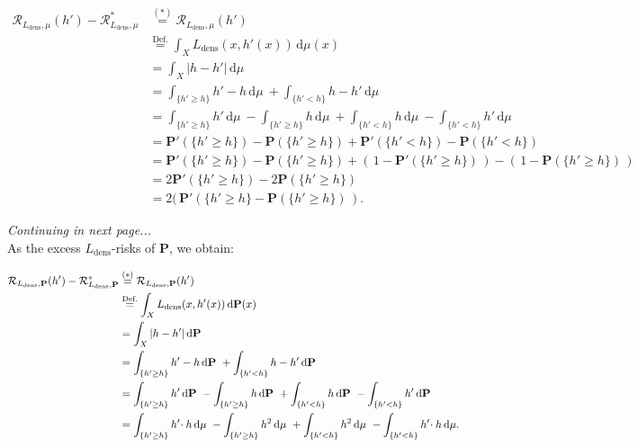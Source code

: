 \documentclass{article}
\begin{document}
\begin{spacing}{1.8} \vspace*{-1.3cm}
\begin{align*}
\mathcal{R}_{L_{\text{dens}},\mu}(h')-\mathcal{R}_{L_{\text{dens}},\mu}^* & \overset{(*)}{=} \mathcal{R}_{L_{\text{dens}},\mu}(h') \\
& \overset{\text{Def.}}{=}  \displaystyle{ \int_X L_{\text{dens}}(x,h'(x)) \,  \text{d}\mu(x) } \\
& =  \displaystyle{ \int_X |h-h'| \,  \text{d}\mu } \\
& =  \displaystyle{ \int_{ \{h'\geq h\} } h'-h \,  \text{d}\mu \ + \int_{ \{ h'< h \} } h-h' \,  \text{d}\mu } \\
& =  \displaystyle{ \int_{ \{h'\geq h\} } h' \,  \text{d}\mu \ - \int_{ \{h'\geq h\} } h \,  \text{d}\mu \ + \int_{ \{ h'< h \} } h \,  \text{d}\mu \ -  \int_{ \{ h'< h \} } h' \,  \text{d}\mu } \\
& =  \mathbf{P} '(\{h'\geq h\}  ) - \mathbf{P} (\{h'\geq h\}  ) + \mathbf{P} '(\{h'< h\}  ) - \mathbf{P} (\{h'< h\}  )   \\
& =  \mathbf{P} '(\{h'\geq h\}  ) - \mathbf{P} (\{h'\geq h\}  ) + (\,1-\mathbf{P} '(\{h'\geq h\}  )\,) - (\,1-\mathbf{P} (\{h'\geq h\}  )\,)   \\
& =  2\mathbf{P} '(\{h'\geq h\}  ) - 2\mathbf{P} (\{h'\geq h\}  )\\
& =  2(\, \mathbf{P} '(\{h'\geq h\}  - \mathbf{P} (\{h'\geq h\}  ) \, ).
\end{align*}
\end{spacing}
\vspace*{1cm} \textit{Continuing in next page...} \\
As the excess $L_{\text{dens}}$-risks of $\mathbf{P}$, we obtain:
\begin{spacing}{1.8} \vspace*{-1.3cm}
\begin{align*}
\mathcal{R}_{L_{\text{dens}},\mathbf{P}}(h')-\mathcal{R}_{L_{\text{dens}},\mathbf{P}}^* & \overset{(*)}{=} \mathcal{R}_{L_{\text{dens}},\mathbf{P}}(h') \\
& \overset{\text{Def.}}{=}  \displaystyle{ \int_X L_{\text{dens}}(x,h'(x)) \,  \text{d}\mathbf{P}(x) } \\
& =  \displaystyle{ \int_X |h-h'| \,  \text{d}\mathbf{P} } \\
& =  \displaystyle{ \int_{ \{h'\geq h\} } h'-h \,  \text{d}\mathbf{P} \ + \int_{ \{ h'< h \} } h-h' \,  \text{d}\mathbf{P} } \\
& =  \displaystyle{ \int_{ \{h'\geq h\} } h' \,  \text{d}\mathbf{P} \ - \int_{ \{h'\geq h\} } h \,  \text{d}\mathbf{P} \ + \int_{ \{ h'< h \} } h \,  \text{d}\mathbf{P} \ -  \int_{ \{ h'< h \} } h' \,  \text{d}\mathbf{P} } \\
& =  \displaystyle{ \int_{ \{h'\geq h\} } h' \hspace{-0.2em} \cdot h \,  \text{d}\mu \ - \int_{ \{h'\geq h\} } h^2 \,  \text{d}\mu \ + \int_{ \{ h'< h \} } h^2 \,  \text{d}\mu \ -  \int_{ \{ h'< h \} } h' \hspace{-0.2em} \cdot h \,  \text{d}\mu } .
\end{align*}
\end{spacing}
\end{document}
